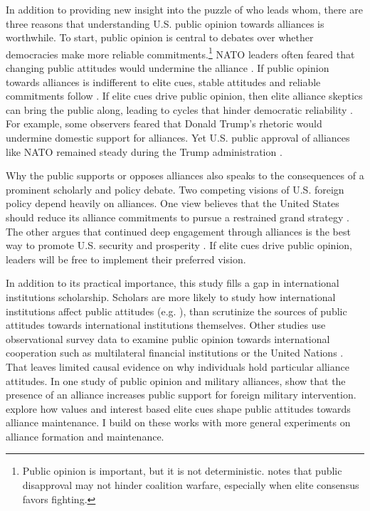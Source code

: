 \documentclass[12pt]{article}
\begin{document}
In addition to providing new insight into the puzzle of who leads whom, there are three reasons that understanding U.S. public opinion towards alliances is worthwhile. 
To start, public opinion is central to debates over whether democracies make more reliable commitments.\footnote{Public opinion is important, but it is not deterministic. \citet{Kreps2010} notes that public disapproval may not hinder coalition warfare, especially when elite consensus favors fighting.}
NATO leaders often feared that changing public attitudes would undermine the alliance \citep{Sayle2019}.   
If public opinion towards alliances is indifferent to elite cues, stable attitudes and reliable commitments follow \citep{Gaubatz1996}.
If elite cues drive public opinion, then elite alliance skeptics can bring the public along, leading to cycles that hinder democratic reliability \citep{GartzkeGleditsch2004}.
For example, some observers feared that Donald Trump's rhetoric would undermine domestic support for alliances.
Yet U.S. public approval of alliances like NATO remained steady during the Trump administration \citep{PewNATO2020}. 


Why the public supports or opposes alliances also speaks to the consequences of a prominent scholarly and policy debate. 
Two competing visions of U.S. foreign policy depend heavily on alliances. 
One view believes that the United States should reduce its alliance commitments to pursue a restrained grand strategy \citep{Preble2009, Posen2014}.
The other argues that continued deep engagement through alliances is the best way to promote U.S. security and prosperity \citep{Brooksetal2013, BrandsFeaver2017}. 
If elite cues drive public opinion, leaders will be free to implement their preferred vision. 



In addition to its practical importance, this study fills a gap in international institutions scholarship. 
Scholars are more likely to study how international institutions affect public attitudes (e.g. \citep{KayaWalker2014, Greenhill2020}), than scrutinize the sources of public attitudes towards international institutions themselves. 
Other studies use observational survey data to examine public opinion towards international cooperation such as multilateral financial institutions \citep{Edwards2009} or the United Nations \citep{Torgler2008, DellmuthTallberg2015}. 
That leaves limited causal evidence on why individuals hold particular alliance attitudes.
In one study of public opinion and military alliances, \citet{TomzWeeks2021} show that the presence of an alliance increases public support for foreign military intervention. 
\citet{Chuetal2021} explore how values and interest based elite cues shape public attitudes towards alliance maintenance. 
I build on these works with more general experiments on alliance formation and maintenance. 
\end{document}

